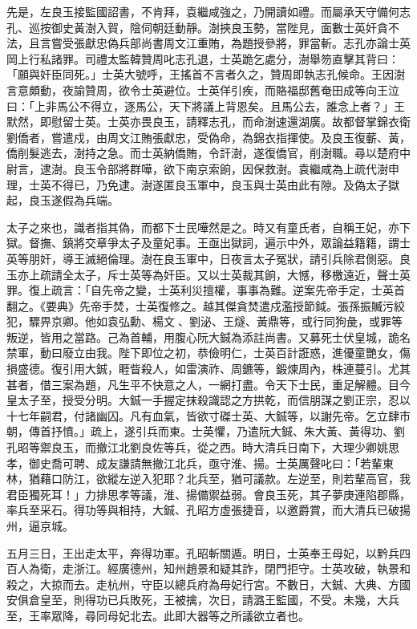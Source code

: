 \begin{pinyinscope}
先是，左良玉接監國詔書，不肯拜，袁繼咸強之，乃開讀如禮。而屬承天守備何志孔、巡按御史黃澍入賀，陰伺朝廷動靜。澍挾良玉勢，當陛見，面數士英奸貪不法，且言嘗受張獻忠偽兵部尚書周文江重賄，為題授參將，罪當斬。志孔亦論士英岡上行私諸罪。司禮太監韓贊周叱志孔退，士英跪乞處分，澍舉笏直擊其背曰：「願與奸臣同死。」士英大號呼，王搖首不言者久之，贊周即執志孔候命。王因澍言意頗動，夜諭贊周，欲令士英避位。士英佯引疾，而賂福邸舊奄田成等向王泣曰：「上非馬公不得立，逐馬公，天下將議上背恩矣。且馬公去，誰念上者？」王默然，即慰留士英。士英亦畏良玉，請釋志孔，而命澍速還湖廣。故都督掌錦衣衛劉僑者，嘗遣戍，由周文江賄張獻忠，受偽命，為錦衣指揮使。及良玉復蘄、黃，僑削髮逃去，澍持之急。而士英納僑賄，令訐澍，遂復僑官，削澍職。尋以楚府中尉言，逮澍。良玉令部將群嘩，欲下南京索餉，因保救澍。袁繼咸為上疏代澍申理，士英不得已，乃免逮。澍遂匿良玉軍中，良玉與士英由此有隙。及偽太子獄起，良玉遂假為兵端。

太子之來也，識者指其偽，而都下士民嘩然是之。時又有童氏者，自稱王妃，亦下獄。督撫、鎮將交章爭太子及童妃事。王亟出獄詞，遍示中外，眾論益籍籍，謂士英等朋奸，導王滅絕倫理。澍在良玉軍中，日夜言太子冤狀，請引兵除君側惡。良玉亦上疏請全太子，斥士英等為奸臣。又以士英裁其餉，大憾，移檄遠近，聲士英罪。復上疏言：「自先帝之變，士英利災擅權，事事為難。逆案先帝手定，士英首翻之。《要典》先帝手焚，士英復修之。越其傑貪焚遣戍濫授節鉞。張孫振贓污絞犯，驟畀京卿。他如袁弘勳、楊文、劉泌、王燧、黃鼎等，或行同狗彘，或罪等叛逆，皆用之當路。己為首輔，用腹心阮大鋮為添註尚書。又募死士伏皇城，詭名禁軍，動曰廢立由我。陛下即位之初，恭儉明仁，士英百計誑惑，進優童艷女，傷損盛德。復引用大鋮，睚眥殺人，如雷演祚、周鑣等，鍛煉周內，株連蔓引。尤其甚者，借三案為題，凡生平不快意之人，一網打盡。令天下士民，重足解體。目今皇太子至，授受分明。大鋮一手握定抹殺識認之方拱乾，而信朋謀之劉正宗，忍以十七年嗣君，付諸幽囚。凡有血氣，皆欲寸磔士英、大鋮等，以謝先帝。乞立肆市朝，傳首抒憤。」疏上，遂引兵而東。士英懼，乃遣阮大鋮、朱大黃、黃得功、劉孔昭等禦良玉，而撤江北劉良佐等兵，從之西。時大清兵日南下，大理少卿姚思孝，御史喬可聘、成友謙請無撤江北兵，亟守淮、揚。士英厲聲叱曰：「若輩東林，猶藉口防江，欲縱左逆入犯耶？北兵至，猶可議款。左逆至，則若輩高官，我君臣獨死耳！」力排思孝等議，淮、揚備禦益弱。會良玉死，其子夢庚連陷郡縣，率兵至采石。得功等與相持，大鋮、孔昭方虛張捷音，以邀爵賞，而大清兵已破揚州，逼京城。

五月三日，王出走太平，奔得功軍。孔昭斬關遁。明日，士英奉王母妃，以黔兵四百人為衛，走浙江。經廣德州，知州趙景和疑其詐，閉門拒守。士英攻破，執景和殺之，大掠而去。走杭州，守臣以總兵府為母妃行宮。不數日，大鋮、大典、方國安俱倉皇至，則得功已兵敗死，王被擒，次日，請潞王監國，不受。未幾，大兵至，王率眾降，尋同母妃北去。此即大器等之所議欲立者也。


\end{pinyinscope}
